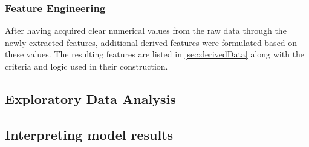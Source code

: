 \subsubsection{Feature Engineering}
\noindent After having acquired clear numerical values from the raw data through the newly extracted features, additional derived features were formulated based on these values. The resulting features are listed in \autoref{sec:derivedData} along with the criteria and logic used in their construction.   

\subsection{Exploratory Data Analysis}

\subsection{Interpreting model results}










